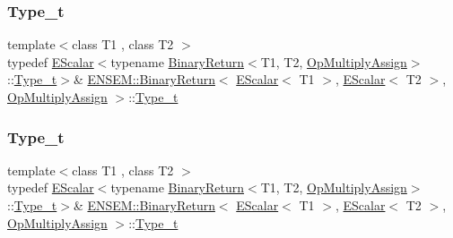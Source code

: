 \subsubsection{\texorpdfstring{Type\_t}{Type\_t}\hspace{0.1cm}{\footnotesize\ttfamily [1/2]}}
{\footnotesize\ttfamily template$<$class T1 , class T2 $>$ \\
typedef \mbox{\hyperlink{classENSEM_1_1EScalar}{E\+Scalar}}$<$typename \mbox{\hyperlink{structENSEM_1_1BinaryReturn}{Binary\+Return}}$<$T1, T2, \mbox{\hyperlink{structENSEM_1_1OpMultiplyAssign}{Op\+Multiply\+Assign}}$>$\+::\mbox{\hyperlink{structENSEM_1_1BinaryReturn_3_01EScalar_3_01T1_01_4_00_01EScalar_3_01T2_01_4_00_01OpMultiplyAssign_01_4_a2f77c1c4166c0bd97216ba05e9c89291}{Type\+\_\+t}}$>$\& \mbox{\hyperlink{structENSEM_1_1BinaryReturn}{E\+N\+S\+E\+M\+::\+Binary\+Return}}$<$ \mbox{\hyperlink{classENSEM_1_1EScalar}{E\+Scalar}}$<$ T1 $>$, \mbox{\hyperlink{classENSEM_1_1EScalar}{E\+Scalar}}$<$ T2 $>$, \mbox{\hyperlink{structENSEM_1_1OpMultiplyAssign}{Op\+Multiply\+Assign}} $>$\+::\mbox{\hyperlink{structENSEM_1_1BinaryReturn_3_01EScalar_3_01T1_01_4_00_01EScalar_3_01T2_01_4_00_01OpMultiplyAssign_01_4_a2f77c1c4166c0bd97216ba05e9c89291}{Type\+\_\+t}}}

\mbox{\label{structENSEM_1_1BinaryReturn_3_01EScalar_3_01T1_01_4_00_01EScalar_3_01T2_01_4_00_01OpMultiplyAssign_01_4_a2f77c1c4166c0bd97216ba05e9c89291}} 
\subsubsection{\texorpdfstring{Type\_t}{Type\_t}\hspace{0.1cm}{\footnotesize\ttfamily [2/2]}}
{\footnotesize\ttfamily template$<$class T1 , class T2 $>$ \\
typedef \mbox{\hyperlink{classENSEM_1_1EScalar}{E\+Scalar}}$<$typename \mbox{\hyperlink{structENSEM_1_1BinaryReturn}{Binary\+Return}}$<$T1, T2, \mbox{\hyperlink{structENSEM_1_1OpMultiplyAssign}{Op\+Multiply\+Assign}}$>$\+::\mbox{\hyperlink{structENSEM_1_1BinaryReturn_3_01EScalar_3_01T1_01_4_00_01EScalar_3_01T2_01_4_00_01OpMultiplyAssign_01_4_a2f77c1c4166c0bd97216ba05e9c89291}{Type\+\_\+t}}$>$\& \mbox{\hyperlink{structENSEM_1_1BinaryReturn}{E\+N\+S\+E\+M\+::\+Binary\+Return}}$<$ \mbox{\hyperlink{classENSEM_1_1EScalar}{E\+Scalar}}$<$ T1 $>$, \mbox{\hyperlink{classENSEM_1_1EScalar}{E\+Scalar}}$<$ T2 $>$, \mbox{\hyperlink{structENSEM_1_1OpMultiplyAssign}{Op\+Multiply\+Assign}} $>$\+::\mbox{\hyperlink{structENSEM_1_1BinaryReturn_3_01EScalar_3_01T1_01_4_00_01EScalar_3_01T2_01_4_00_01OpMultiplyAssign_01_4_a2f77c1c4166c0bd97216ba05e9c89291}{Type\+\_\+t}}}



